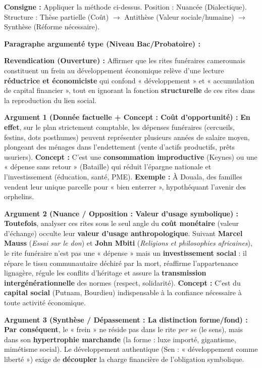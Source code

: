 \documentclass[11pt]{article}
\begin{document}
\begin{exoresolu}
\textbf{Consigne :} Appliquer la méthode ci-dessus. Position : Nuancée (Dialectique). Structure : Thèse partielle (Coût) $\to$ Antithèse (Valeur sociale/humaine) $\to$ Synthèse (Réforme nécessaire).

\tcblower

\textbf{Paragraphe argumenté type (Niveau Bac/Probatoire) :}

\textbf{Revendication (Ouverture) :} Affirmer que les rites funéraires camerounais constituent un frein au développement économique relève d'une lecture \textbf{réductrice et économiciste} qui confond « développement » et « accumulation de capital financier », tout en ignorant la fonction \textbf{structurelle} de ces rites dans la reproduction du lien social.

\textbf{Argument 1 (Donnée factuelle + Concept : Coût d'opportunité) :} \textbf{En effet}, sur le plan strictement comptable, les dépenses funéraires (cercueils, festins, dots posthumes) peuvent représenter plusieurs années de salaire moyen, plongeant des ménages dans l'endettement (vente d'actifs productifs, prêts usuriers). \textbf{Concept :} C'est une \textbf{consommation improductive} (Keynes) ou une « dépense sans retour » (Bataille) qui réduit l'épargne nationale et l'investissement (éducation, santé, PME). \textbf{Exemple :} À Douala, des familles vendent leur unique parcelle pour « bien enterrer », hypothéquant l'avenir des orphelins.

\textbf{Argument 2 (Nuance / Opposition : Valeur d'usage symbolique) :} \textbf{Toutefois}, analyser ces rites sous le seul angle du \textbf{coût monétaire} (valeur d'échange) occulte leur \textbf{valeur d'usage anthropologique}. Suivant \textbf{Marcel Mauss} (\emph{Essai sur le don}) et \textbf{John Mbiti} (\emph{Religions et philosophies africaines}), le rite funéraire n'est pas une « dépense » mais un \textbf{investissement social} : il répare le tissu communautaire déchiré par la mort, réaffirme l'appartenance lignagère, régule les conflits d'héritage et assure la \textbf{transmission intergénérationnelle} des normes (respect, solidarité). \textbf{Concept :} C'est du \textbf{capital social} (Putnam, Bourdieu) indispensable à la confiance nécessaire à toute activité économique.

\textbf{Argument 3 (Synthèse / Dépassement : La distinction forme/fond) :} \textbf{Par conséquent}, le « frein » ne réside pas dans le rite \emph{per se} (le sens), mais dans son \textbf{hypertrophie marchande} (la forme : luxe importé, gigantisme, mimétisme social). Le développement authentique (Sen : « développement comme liberté ») exige de \textbf{découpler} la charge financière de l'obligation symbolique.


\end{exoresolu}
\end{document}
